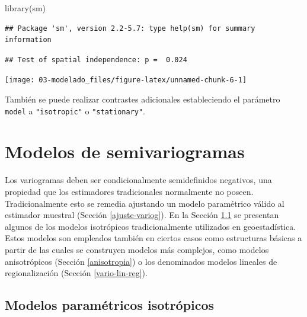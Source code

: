 \documentclass[
  spanish,
]{book}
\newenvironment{Shaded}{\begin{snugshade}}{\end{snugshade}}
\newcommand{\AttributeTok}[1]{\textcolor[rgb]{0.77,0.63,0.00}{#1}}
\newcommand{\FunctionTok}[1]{\textcolor[rgb]{0.00,0.00,0.00}{#1}}
\newcommand{\NormalTok}[1]{#1}
\newcommand{\SpecialCharTok}[1]{\textcolor[rgb]{0.00,0.00,0.00}{#1}}
\newcommand{\StringTok}[1]{\textcolor[rgb]{0.31,0.60,0.02}{#1}}
\theoremstyle{break}
\begin{document}
\begin{Shaded}
\begin{Highlighting}[]
\FunctionTok{library}\NormalTok{(sm)}
\end{Highlighting}
\end{Shaded}

\begin{verbatim}
## Package 'sm', version 2.2-5.7: type help(sm) for summary information
\end{verbatim}

\begin{Shaded}
\end{Shaded}

\begin{verbatim}
## Test of spatial independence: p =  0.024
\end{verbatim}

\begin{center}\texttt{[image: 03-modelado\_files/figure-latex/unnamed-chunk-6-1]} \end{center}

También se puede realizar contrastes adicionales estableciendo el parámetro \texttt{model} a \texttt{"isotropic"} o \texttt{"stationary"}.

\hypertarget{modelos-variog}{%
\section{Modelos de semivariogramas}\label{modelos-variog}}

Los variogramas deben ser condicionalmente semidefinidos negativos, una propiedad que los estimadores tradicionales normalmente no poseen.
Tradicionalmente esto se remedia ajustando un modelo paramétrico válido al estimador muestral (Sección \ref{ajuste-variog}).
En la Sección \ref{modelos-parametricos} se presentan algunos de los modelos isotrópicos tradicionalmente utilizados en geoestadística.
Estos modelos son empleados también en ciertos casos como estructuras básicas a partir de las cuales se construyen modelos más complejos, como modelos anisotrópicos (Sección \ref{anisotropia}) o los denominados modelos lineales de regionalización (Sección \ref{vario-lin-reg}).

\hypertarget{modelos-parametricos}{%
\subsection{Modelos paramétricos isotrópicos}\label{modelos-parametricos}}
\end{document}
